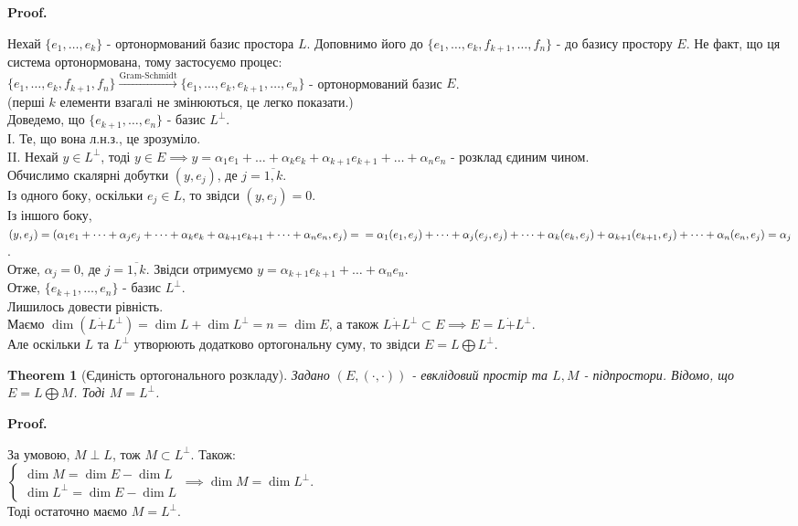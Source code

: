 \documentclass[a4paper, 10pt]{article}
\makeatletter
\theoremstyle{theoremdd}
\newtheorem{theorem}{Theorem}[subsection]
\renewenvironment{proof}[1][Proof.\\]{\par
\pushQED{\hfill \qed}%
\normalfont \topsep6\p@\@plus6\p@\relax
\trivlist
\item\relax
{\bfseries
#1\@addpunct{.}}\hspace\labelsep\ignorespaces
}{%
\popQED\endtrivlist\@endpefalse
}
\makeatother
\begin{document}
\begin{proof}
Нехай $\{e_1,\dots,e_k\}$ - ортонормований базис простора $L$. Доповнимо його до $\{e_1,\dots,e_k,f_{k+1},\dots,f_n\}$ - до базису простору $E$. Не факт, що ця система ортонормована, тому застосуємо процес:\\
$\{e_1,\dots,e_k,f_{k+1},f_n\} \overset{\textrm{Gram-Schmidt}}{\longrightarrow} \{e_1,\dots,e_k, e_{k+1},\dots,e_n\}$ - ортонормований базис $E$.\\
(перші $k$ елементи взагалі не змінюються, це легко показати.)\\
Доведемо, що $\{e_{k+1},\dots, e_n\}$ - базис $L^\perp$.\\
І. Те, що вона л.н.з., це зрозуміло.\\
II. Нехай $y \in L^\perp$, тоді $y \in E \implies y = \alpha_1 e_1 + \dots + \alpha_k e_k + \alpha_{k+1} e_{k+1} + \dots + \alpha_n e_n$ - розклад єдиним чином.\\
Обчислимо скалярні добутки $(y,e_j)$, де $j=\overline{1,k}$.\\
Із одного боку, оскільки $e_j \in L$, то звідси $(y,e_j) = 0$.\\
Із іншого боку, $(y,e_j) = (\alpha_1 e_1 + \dots + \alpha_j e_j + \dots + \alpha_k e_k + \alpha_{k+1} e_{k+1} + \dots + \alpha_n e_n, e_j) = \\
= \alpha_1 (e_1,e_j) + \dots + \alpha_j (e_j,e_j) + \dots + \alpha_k (e_k,e_j) + \alpha_{k+1} (e_{k+1},e_j) + \dots + \alpha_n (e_n,e_j) = \alpha_j$.\\
Отже, $\alpha_j = 0$, де $j=\overline{1,k}$. Звідси отримуємо $y = \alpha_{k+1} e_{k+1} + \dots + \alpha_n e_n$.\\
Отже, $\{e_{k+1},\dots, e_n\}$ - базис $L^\perp$.\\
Лишилось довести рівність. \\
Маємо $\dim (L \dot{+} L^\perp) = \dim L + \dim L^\perp = n = \dim E$, а також $L\dot{+}L^\perp \subset E \implies E = L \dot{+} L^\perp$.\\
Але оскільки $L$ та $L^\perp$ утворюють додатково ортогональну суму, то звідси $E = L \bigoplus L^\perp$.
\end{proof}

\begin{theorem}[Єдиність ортогонального розкладу]
Задано $(E,(\cdot,\cdot))$ - евклідовий простір та $L,M$ - підпростори. Відомо, що $E = L \bigoplus M$. Тоді $M = L^\perp$.
\end{theorem}

\begin{proof}
За умовою, $M \perp L$, тож $M \subset L^{\perp}$. Також:\\
$\begin{cases}
\dim M = \dim E - \dim L \\
\dim L^{\perp} = \dim E - \dim L
\end{cases} \implies \dim M = \dim L^\perp$.\\
Тоді остаточно маємо $M = L^\perp$.
\end{proof}
\end{document}
